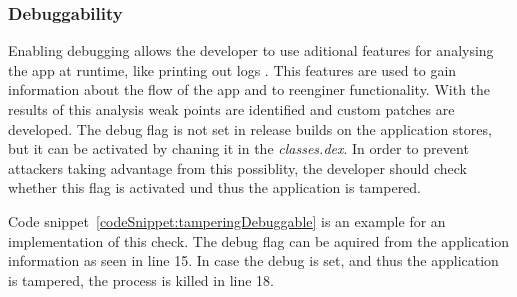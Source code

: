 \subsubsection{Debuggability} \label{subsection:section:counter-improve-tampering-debuggable}
Enabling debugging allows the developer to use aditional features for analysing the app at runtime, like printing out logs \cite{androidDebugging}.
This features are used to gain information about the flow of the app and to reenginer functionality.
With the results of this analysis weak points are identified and custom patches are developed.
\newline
The debug flag is not set in release builds on the application stores, but it can be activated by chaning it in the \textit{classes.dex}.
In order to prevent attackers taking advantage from this possiblity, the developer should check whether this flag is activated und thus the application is tampered.
\newline

Code snippet~\ref{codeSnippet:tamperingDebuggable} is an example for an implementation of this check.
The debug flag can be aquired from the application information as seen in line 15.
In case the debug is set, and thus the application is tampered, the process is killed in line 18.
